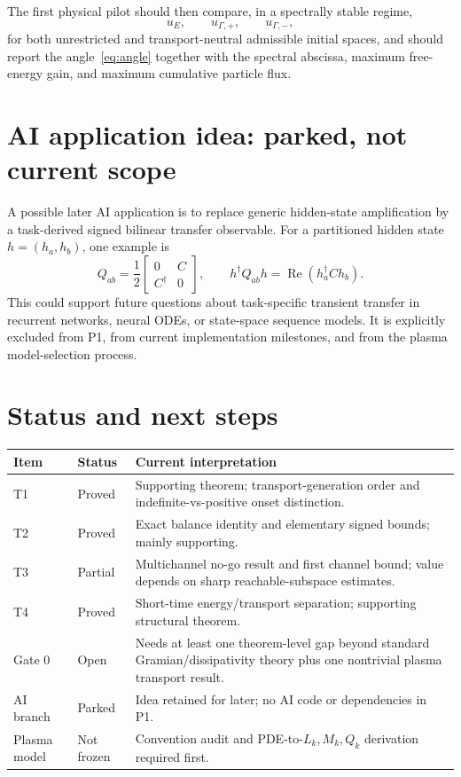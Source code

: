 \documentclass[11pt,a4paper]{article}
\begin{document}
The first physical pilot should then compare, in a spectrally stable regime,
\begin{equation}
  u_E,\qquad u_{\Gamma,+},\qquad u_{\Gamma,-},
\end{equation}
for both unrestricted and transport-neutral admissible initial spaces, and should report the angle~\eqref{eq:angle} together with the spectral abscissa, maximum free-energy gain, and maximum cumulative particle flux.

\section{AI application idea: parked, not current scope}

A possible later AI application is to replace generic hidden-state amplification by a task-derived signed bilinear transfer observable. For a partitioned hidden state $h=(h_a,h_b)$, one example is
\begin{equation}
  Q_{ab}=\frac12
  \begin{bmatrix}
    0 & C\\
    C^\dagger & 0
  \end{bmatrix},
  \qquad
  h^\dagger Q_{ab}h
  =\operatorname{Re}(h_a^\dagger C h_b).
\end{equation}
This could support future questions about task-specific transient transfer in recurrent networks, neural ODEs, or state-space sequence models. It is explicitly excluded from P1, from current implementation milestones, and from the plasma model-selection process.

\section{Status and next steps}

\begin{longtable}{>{\raggedright\arraybackslash}p{} >{\raggedright\arraybackslash}p{} p{}}
\toprule
Item & Status & Current interpretation \\
\midrule
\endhead
T1 & Proved & Supporting theorem; transport-generation order and indefinite-vs-positive onset distinction. \\
T2 & Proved & Exact balance identity and elementary signed bounds; mainly supporting. \\
T3 & Partial & Multichannel no-go result and first channel bound; value depends on sharp reachable-subspace estimates. \\
T4 & Proved & Short-time energy/transport separation; supporting structural theorem. \\
Gate 0 & Open & Needs at least one theorem-level gap beyond standard Gramian/dissipativity theory plus one nontrivial plasma transport result. \\
AI branch & Parked & Idea retained for later; no AI code or dependencies in P1. \\
Plasma model & Not frozen & Convention audit and PDE-to-$L_k,M_k,Q_k$ derivation required first. \\
\bottomrule
\end{longtable}
\end{document}
